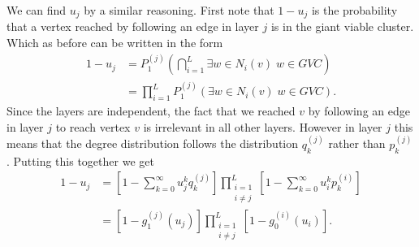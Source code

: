 \documentclass[
11pt, %
english, %
singlespacing, %
nolistspacing, %
liststotoc, %
headsepline, %
]{MastersDoctoralThesis} %
\begin{document}
We can find $u_j$ by a similar reasoning. First note that $1 - u_j$ is the probability that a vertex reached by following an edge in layer $j$ is in the giant viable cluster. Which as before can be written in the form
\begin{align}
	1 - u_j &= P_1^{(j)}\left(\bigcap_{i = 1}^{L} \exists w \in N_i(v) \; w \in GVC\right)\\
	&= \prod_{i = 1}^{L}  P_1^{(j)}\left(\exists w \in N_i(v) \; w \in GVC \right).
\end{align}
Since the layers are independent, the fact that we reached $v$ by following an edge in layer $j$ to reach vertex $v$ is irrelevant in all other layers. However in layer $j$ this means that the degree distribution follows the distribution $q_k^{(j)}$ rather than $p_k^{(j)}$. Putting this together we get
\begin{align}
	1 - u_j &= \left[1 - \sum_{k = 0}^{\infty} u_j^k q_k^{(j)} \right] \prod_{\substack{i = 1 \\ i \neq j}}^{L}  \left[1 - \sum_{k = 0}^{\infty} u_i^k p^{(i)}_k \right] \\
	&= \left[1 - g_1^{(j)}(u_j) \right] \prod_{\substack{i = 1 \\ i \neq j}}^{L}  \left[1 - g_0^{(i)}(u_i) \right]. \label{Multiplex u final}
\end{align}
\end{document}
